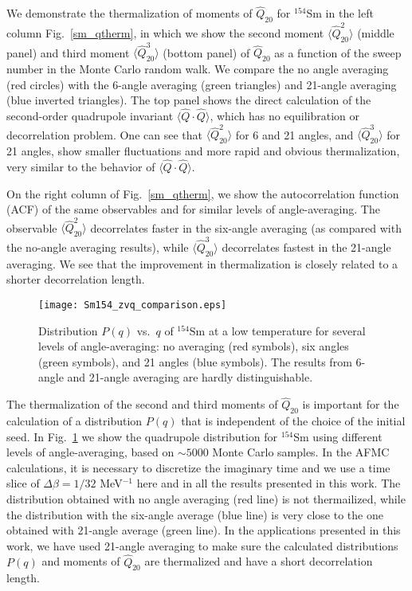 \documentclass[prc,twocolumn,aps,showpacs,floatfix,nofootinbib,letterpaper,preprintnumbers]{revtex4-1}
\begin{document}
We demonstrate the thermalization of moments of $\hat Q_{20}$ for $^{154}$Sm in the left column Fig.~\ref{sm_qtherm}, in which we show the second moment $\langle \hat Q^2_{20}\rangle$ (middle panel) and third moment  $\langle \hat Q^3_{20}\rangle$ (bottom panel) of $\hat Q_{20}$  as a function of the sweep number in the Monte Carlo random walk.  We compare the no angle averaging (red circles) with the 6-angle averaging (green triangles) and 21-angle averaging (blue inverted triangles). The top panel shows the direct calculation of the second-order quadrupole invariant $\langle \hat{Q} \cdot \hat{Q} \rangle$, which has no equilibration or decorrelation problem. One can see that $\langle \hat Q_{20}^2 \rangle$ for 6 and 21 angles, and $\langle \hat Q_{20}^3 \rangle$ for 21 angles, show smaller fluctuations and more rapid and obvious thermalization, very similar to the behavior of $\langle \hat Q \cdot \hat Q \rangle$.

On the right column of Fig.~\ref{sm_qtherm}, we show the autocorrelation function (ACF) of the same observables and for similar levels of angle-averaging.  The observable $\langle \hat{Q}_{20}^2 \rangle$ decorrelates faster in the six-angle averaging (as compared with the no-angle averaging results), while $\langle \hat{Q}_{20}^3 \rangle$ decorrelates fastest in the 21-angle averaging. We see that the improvement in thermalization is closely related to a shorter decorrelation length.

\begin{figure}[bth]
   \texttt{[image: Sm154\_zvq\_comparison.eps]}
    \caption{Distribution $P(q)$ vs.~$q$ of $^{154}\text{Sm}$ at a low temperature for several levels of angle-averaging: no averaging (red symbols), six angles (green symbols), and 21 angles (blue symbols). The results from 6-angle and 21-angle averaging are hardly distinguishable. }
    \label{sm_zvq_avging}
\end{figure} 

The thermalization of the second and third moments of $\hat Q_{20}$ is important for the calculation of a distribution $P(q)$ that is independent of the choice of the initial seed. In Fig.~\ref{sm_zvq_avging} we show the quadrupole distribution for $^{154}$Sm using different levels of angle-averaging, based on $\sim 5000$ Monte Carlo samples.  In the  AFMC calculations, it is necessary to discretize the imaginary time and we use a time slice of $\Delta \beta=1/32$ MeV$^{-1}$ here and in all the results presented in this work. The distribution obtained with no angle averaging (red line) is not thermailized, while the distribution with the six-angle average (blue line) is very close to the one obtained with 21-angle average (green line). In the applications presented in this work, we have used 21-angle averaging to make sure the calculated distributions $P(q)$ and moments of $\hat Q_{20}$ are thermalized and have a short decorrelation length. 
\end{document}
